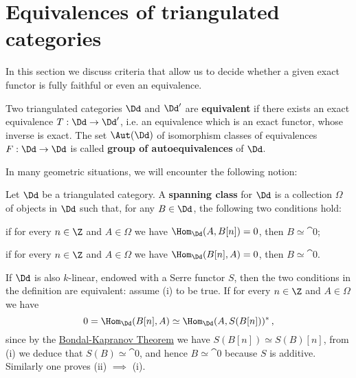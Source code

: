 
\section{Equivalences of triangulated categories}

In this section we discuss criteria that allow us to decide 
whether a given exact functor is fully faithful or even an equivalence. 

\begin{df}
    Two triangulated categories $\Dd$ and $\Dd'$ are \textbf{equivalent}
    if there exists an exact equivalence $T : \Dd \to \Dd'$,
    i.e. an equivalence which is an exact functor, whose inverse is exact.
    The set $\Aut(\Dd)$ of isomorphism classes of equivalences $F:\Dd \to \Dd$
    is called \textbf{group of autoequivalences} of $\Dd$.
\end{df}

In many geometric situations, we will encounter the following notion:

\begin{df}
    Let $\Dd$ be a triangulated category.
    A \textbf{spanning class} for $\Dd$ is a collection $\Omega$ 
    of objects in $\Dd$ such that, for any $B \in \Dd$, 
    the following two conditions hold:
    \begin{rmnumerate}
        \item if for every $n \in \Z$ and $A \in \Omega$ we have
        $\Hom_{\Dd}(A,B[n]) = 0$, then $B \simeq \cat{0}$;
        \item if for every $n \in \Z$ and $A \in \Omega$ we have
        $\Hom_{\Dd}(B[n],A) = 0$, then $B \simeq \cat{0}$.
    \end{rmnumerate}
\end{df}

\begin{rmk}
    If $\Dd$ is also $k$-linear, endowed with a Serre functor $S$, 
    then the two conditions in the definition are equivalent:
    assume (i) to be true. 
    If for every $n \in \Z$ and $A \in \Omega$ we have
    \begin{equation*}
        0 = \Hom_{\Dd}(B[n],A) \simeq \Hom_{\Dd}(A,S(B[n]))^*\,,
    \end{equation*}
    since by the \hyperref[BondalKapranov]{Bondal-Kapranov Theorem}
    we have $S(B[n]) \simeq S(B)[n]$, from (i) we deduce that
    $S(B) \simeq \cat{0}$, and hence $B \simeq \cat{0}$ because
    $S$ is additive. Similarly one proves (ii) $\implies$ (i).
\end{rmk}

